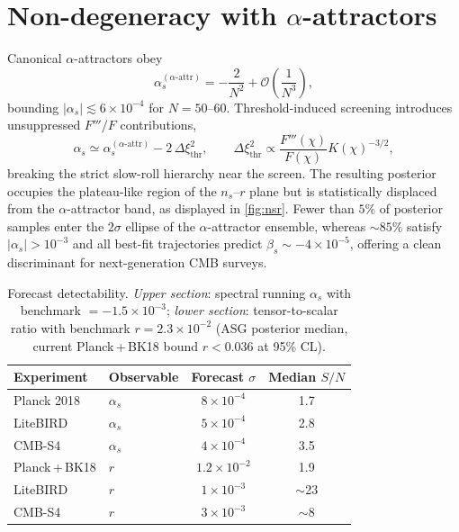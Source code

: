 \documentclass[11pt,a4paper]{article}
\begin{document}
\section{Non-degeneracy with $\alpha$-attractors}
\label{sec:nondegeneracy}
Canonical $\alpha$-attractors obey
\begin{equation}
\alpha_{s}^{(\alpha\text{-attr})}=-\frac{2}{N^{2}}+\mathcal{O}\left(\frac{1}{N^{3}}\right),
\end{equation}
bounding $|\alpha_{s}|\lesssim6\times10^{-4}$ for $N=50$--60. Threshold-induced screening introduces unsuppressed $F'''/F$ contributions,
\begin{equation}
\alpha_{s}\simeq \alpha_{s}^{(\alpha\text{-attr})}-2\,\Delta\xi_{\text{thr}}^{2}, \qquad \Delta\xi_{\text{thr}}^{2}\propto\frac{F'''(\chi)}{F(\chi)}K(\chi)^{-3/2},
\end{equation}
breaking the strict slow-roll hierarchy near the screen. The resulting posterior occupies the plateau-like region of the $n_{s}$--$r$ plane but is statistically displaced from the $\alpha$-attractor band, as displayed in \cref{fig:nsr}. Fewer than $5\%$ of posterior samples enter the $2\sigma$ ellipse of the $\alpha$-attractor ensemble, whereas ${\sim}85\%$ satisfy $|\alpha_{s}|>10^{-3}$ and all best-fit trajectories predict $\beta_{s}\sim -4\times10^{-5}$, offering a clean discriminant for next-generation CMB surveys.

\begin{table}[t]
    \centering
    \caption{Forecast detectability. \emph{Upper section}: spectral running $\alpha_s$ with benchmark $=-1.5\times10^{-3}$; \emph{lower section}: tensor-to-scalar ratio with benchmark $r=2.3\times10^{-2}$ (ASG posterior median, current Planck\,+\,BK18 bound $r<0.036$ at 95\% CL).}
    \begin{tabular}{llcc}
        \toprule
        Experiment & Observable & Forecast $\sigma$ & Median $S/N$ \\
        \midrule
        Planck 2018    & $\alpha_{s}$ & $8\times10^{-4}$ & 1.7 \\
        LiteBIRD       & $\alpha_{s}$ & $5\times10^{-4}$ & 2.8 \\
        CMB-S4         & $\alpha_{s}$ & $4\times10^{-4}$ & 3.5 \\
        \midrule
        Planck\,+\,BK18 & $r$         & $1.2\times10^{-2}$ & 1.9 \\
        LiteBIRD        & $r$         & $1\times10^{-3}$   & $\sim$23 \\
        CMB-S4          & $r$         & $3\times10^{-3}$   & $\sim$8 \\
        \bottomrule
    \end{tabular}
    \label{tab:forecasts}
\end{table}
\end{document}
